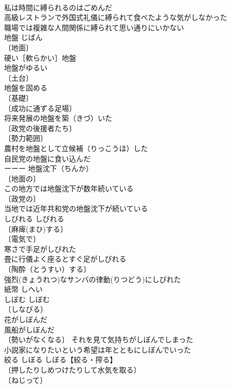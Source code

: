 \documentclass[8pt]{extreport}
\begin{document}
\begin{CJK}{UTF8}{min}
\\	私は時間に縛られるのはごめんだ 
\\	高級レストランで外国式礼儀に縛られて食べたような気がしなかった 
\\	職場では複雑な人間関係に縛られて思い通りにいかない 
\\	地盤	じばん	
\\	〔地面〕
\\	硬い［軟らかい］地盤 
\\	地盤がゆるい 
\\	〔土台〕
\\	地盤を固める 
\\	〔基礎〕
\\	〔成功に通ずる足場〕
\\	将来発展の地盤を築（きづ）いた 
\\	〔政党の後援者たち〕
\\	〔勢力範囲〕
\\	農村を地盤として立候補（りっこうほ）した 
\\	自民党の地盤に食い込んだ 
\\	ーーー 地盤沈下（ちんか） 
\\	〔地面の〕
\\	この地方では地盤沈下が数年続いている 
\\	〔政党の〕
\\	当地では近年共和党の地盤沈下が続いている 
\\	しびれる	しびれる	
\\	〔麻痺(まひ)する〕
\\	〔電気で〕
\\	寒さで手足がしびれた 
\\	畳に行儀よく座るとすぐ足がしびれる 
\\	〔陶酔（とうすい）する〕
\\	強烈(きょうれつ)なサンバの律動(りつどう)にしびれた 
\\	紙幣	しへい	
\\	しぼむ	しぼむ	
\\	〔しなびる〕
\\	花がしぼんだ 
\\	風船がしぼんだ 
\\	〔勢いがなくなる〕 それを見て気持ちがしぼんでしまった 
\\	小説家になりたいという希望は年とともにしぼんでいった 
\\	絞る	しぼる	しぼる【絞る・搾る】 
\\	〔押したりしめつけたりして水気を取る〕
\\	〔ねじって〕

\end{CJK}
\end{document}
